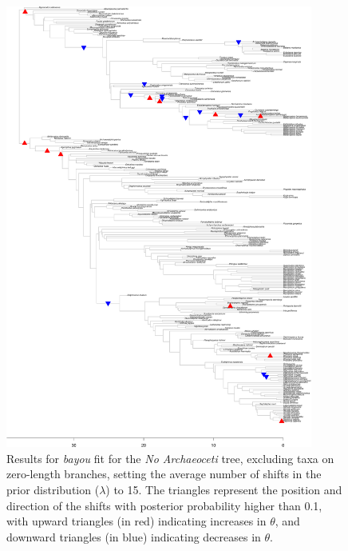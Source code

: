 \begin{figure}[H]
\includegraphics[width=0.9\textwidth]{img/plots-noarchaeo-k15-1.pdf}
\caption{Results for \textit{bayou} fit for the \textit{No Archaeoceti} tree, excluding taxa on zero-length branches, setting the average number of shifts in the prior distribution ($\lambda$) to 15. The triangles represent the position and direction of the shifts with posterior probability higher than 0.1, with upward triangles (in red) indicating increases in $\theta$, and downward triangles (in blue) indicating decreases in $\theta$.}
\label{fig:noarchaeo-k15-nzlb}
\end{figure}

\newpage

